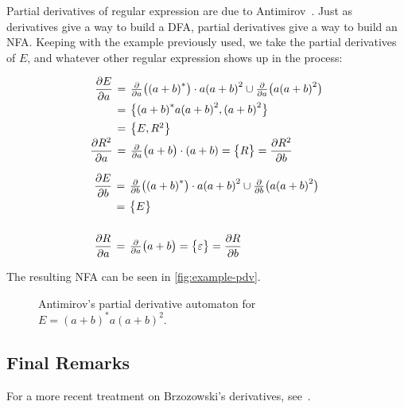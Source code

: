 \documentclass{article}
\theoremstyle{definition}
\newcommand{\emptystr}{\varepsilon}
\newcommand{\pdv}[2]{\frac{\partial}{\partial #2}\bigl(#1\bigr)}
\begin{document}
Partial derivatives of regular expression are due to Antimirov~\cite{An96}. Just as
derivatives give a way to build a DFA, partial derivatives give a way to build
an NFA. Keeping with the example previously used, we take the partial
derivatives of $E$, and whatever other regular expression shows up in the
process:

\begin{minipage}[t]{.5\textwidth}
\[
\arraycolsep=2pt\def\arraystretch{1.4}
  \begin{array}{rcl}
    \dfrac{\partial E}{\partial a} &=& \pdv{{(a+b)}^*}{a}\cdot a{(a+b)}^2 \cup
    \pdv{a{(a+b)}^2}{a} \\
    &=& \bigl\{{(a+b)}^*a{(a+b)}^2, {(a+b)}^2\bigr\} \\
                                   &=& \bigl\{E, R^2\bigr\} \\
    \dfrac{\partial R^2}{\partial a} &=& \pdv{a+b}{a}\cdot {(a+b)} = \bigl\{R \bigr\} = \dfrac{\partial R^2}{\partial b} \\
  \end{array}
\]
\end{minipage}%
\begin{minipage}[t]{.5\textwidth}
\[
\arraycolsep=2pt\def\arraystretch{1.4}
  \begin{array}{rcl}
    \dfrac{\partial E}{\partial b} &=& \pdv{{(a+b)}^*}{b}\cdot a{(a+b)}^2 \cup \pdv{a{(a+b)}^2}{b} \\
                                  &=& \bigl\{E \bigr\} \\
    \\
    \dfrac{\partial R}{\partial a} &=& \pdv{a+b}{a} = \bigl\{\emptystr \bigr\} = \dfrac{\partial R}{\partial b} \\
  \end{array}
\]
\end{minipage}

The resulting NFA can be seen in \autoref{fig:example-pdv}.

\begin{figure}[ht] %
\centering %
  \caption{Antimirov's partial derivative automaton for $E = {(a+b)}^*a{(a+b)}^2$.}\label{fig:example-pdv}
\end{figure}

\subsection{Final Remarks}
For a more recent treatment on Brzozowski's derivatives, see~\cite{ORT09}.

\newpage 


\end{document}
